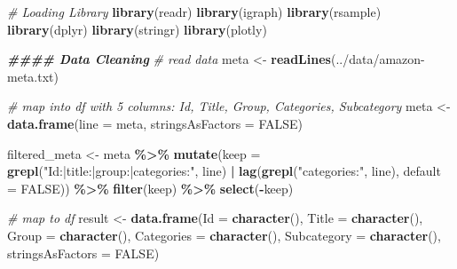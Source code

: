 \documentclass[
]{article}
\newenvironment{Shaded}{\begin{snugshade}}{\end{snugshade}}
\newcommand{\AttributeTok}[1]{\textcolor[rgb]{0.13,0.29,0.53}{#1}}
\newcommand{\CommentTok}[1]{\textcolor[rgb]{0.56,0.35,0.01}{\textit{#1}}}
\newcommand{\ConstantTok}[1]{\textcolor[rgb]{0.56,0.35,0.01}{#1}}
\newcommand{\DocumentationTok}[1]{\textcolor[rgb]{0.56,0.35,0.01}{\textbf{\textit{#1}}}}
\newcommand{\FunctionTok}[1]{\textcolor[rgb]{0.13,0.29,0.53}{\textbf{#1}}}
\newcommand{\NormalTok}[1]{#1}
\newcommand{\OtherTok}[1]{\textcolor[rgb]{0.56,0.35,0.01}{#1}}
\newcommand{\SpecialCharTok}[1]{\textcolor[rgb]{0.81,0.36,0.00}{\textbf{#1}}}
\newcommand{\StringTok}[1]{\textcolor[rgb]{0.31,0.60,0.02}{#1}}
\begin{document}
\begin{Shaded}
\begin{Highlighting}[]
\CommentTok{\# Loading Library}
\FunctionTok{library}\NormalTok{(readr)}
\FunctionTok{library}\NormalTok{(igraph)}
\FunctionTok{library}\NormalTok{(rsample)}
\FunctionTok{library}\NormalTok{(dplyr)}
\FunctionTok{library}\NormalTok{(stringr)}
\FunctionTok{library}\NormalTok{(plotly)}

\DocumentationTok{\#\#\#\# Data Cleaning}
\CommentTok{\# read data}
\NormalTok{meta }\OtherTok{\textless{}{-}} \FunctionTok{readLines}\NormalTok{(}\StringTok{\textquotesingle{}../data/amazon{-}meta.txt\textquotesingle{}}\NormalTok{)}

\CommentTok{\# map into df with 5 columns: Id, Title, Group, Categories, Subcategory}
\NormalTok{meta }\OtherTok{\textless{}{-}} \FunctionTok{data.frame}\NormalTok{(}\AttributeTok{line =}\NormalTok{ meta, }\AttributeTok{stringsAsFactors =} \ConstantTok{FALSE}\NormalTok{)}

\NormalTok{filtered\_meta }\OtherTok{\textless{}{-}}\NormalTok{ meta }\SpecialCharTok{\%\textgreater{}\%}
  \FunctionTok{mutate}\NormalTok{(}\AttributeTok{keep =} \FunctionTok{grepl}\NormalTok{(}\StringTok{"Id:|title:|group:|categories:"}\NormalTok{, line) }\SpecialCharTok{|}
                 \FunctionTok{lag}\NormalTok{(}\FunctionTok{grepl}\NormalTok{(}\StringTok{"categories:"}\NormalTok{, line), }\AttributeTok{default =} \ConstantTok{FALSE}\NormalTok{)) }\SpecialCharTok{\%\textgreater{}\%}
  \FunctionTok{filter}\NormalTok{(keep) }\SpecialCharTok{\%\textgreater{}\%}
  \FunctionTok{select}\NormalTok{(}\SpecialCharTok{{-}}\NormalTok{keep)}

\CommentTok{\# map to df}
\NormalTok{result }\OtherTok{\textless{}{-}} \FunctionTok{data.frame}\NormalTok{(}\AttributeTok{Id =} \FunctionTok{character}\NormalTok{(),}
                     \AttributeTok{Title =} \FunctionTok{character}\NormalTok{(),}
                     \AttributeTok{Group =} \FunctionTok{character}\NormalTok{(),}
                     \AttributeTok{Categories =} \FunctionTok{character}\NormalTok{(),}
                     \AttributeTok{Subcategory =} \FunctionTok{character}\NormalTok{(),}
                     \AttributeTok{stringsAsFactors =} \ConstantTok{FALSE}\NormalTok{)}



\end{Highlighting}
\end{Shaded}
\end{document}
